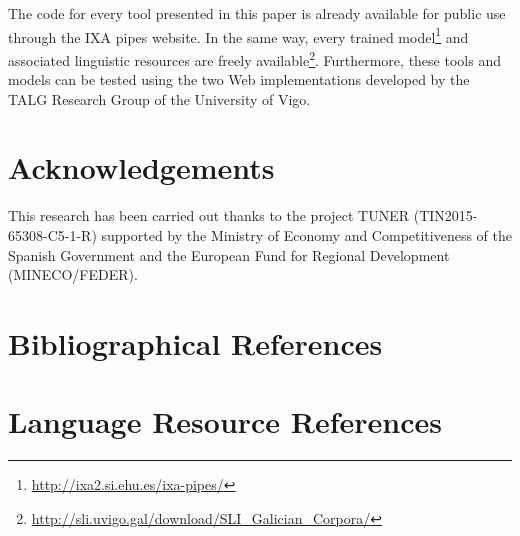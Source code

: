 \documentclass[10pt, a4paper]{article}
\begin{document}
The code for every tool presented in this paper is already available for public use through the IXA pipes website. In the same way, every trained model\footnote{\url{http://ixa2.si.ehu.es/ixa-pipes/}} and associated linguistic resources are freely available\footnote{\url{http://sli.uvigo.gal/download/SLI_Galician_Corpora/}}. Furthermore, these tools and models can be tested using the two Web implementations developed by the TALG Research Group of the University of Vigo.

\section{Acknowledgements}

This research has been carried out thanks to the project TUNER (TIN2015-65308-C5-1-R) supported by the Ministry of Economy and Competitiveness of the Spanish Government and the European Fund for Regional Development (MINECO/FEDER).


\section{Bibliographical References}\label{main:ref}





\section{Language Resource References}\label{lr:ref}
\end{document}
